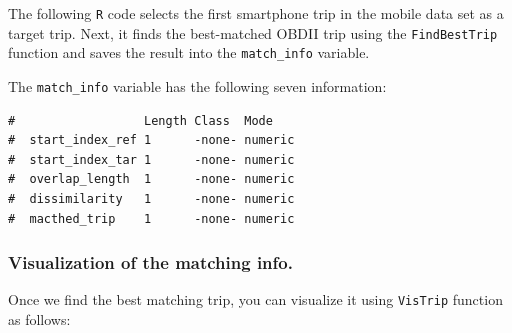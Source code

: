 \documentclass[letterpaper,9pt,twocolumn,twoside,]{pinp}
\begin{document}
The following \texttt{R} code selects the first smartphone trip in the
mobile data set as a target trip. Next, it finds the best-matched OBDII
trip using the \texttt{FindBestTrip} function and saves the result into
the \texttt{match\_info} variable.

\begin{Shaded}
\begin{Highlighting}[]
\StringTok{ }\NormalTok{mobile_data[[}\NormalTok{]]}

\StringTok{ }
\end{Highlighting}
\end{Shaded}

The \texttt{match\_info} variable has the following seven information:

\begin{Shaded}
\begin{Highlighting}[]
\end{Highlighting}
\end{Shaded}

\begin{ShadedResult}
\begin{verbatim}
#                  Length Class  Mode   
#  start_index_ref 1      -none- numeric
#  start_index_tar 1      -none- numeric
#  overlap_length  1      -none- numeric
#  dissimilarity   1      -none- numeric
#  macthed_trip    1      -none- numeric
\end{verbatim}
\end{ShadedResult}

\hypertarget{visualization-of-the-matching-info.}{%
\subsubsection{Visualization of the matching
info.}\label{visualization-of-the-matching-info.}}

Once we find the best matching trip, you can visualize it using
\texttt{VisTrip} function as follows:

\begin{Shaded}
\begin{Highlighting}[]
\end{Highlighting}
\end{Shaded}
\end{document}
